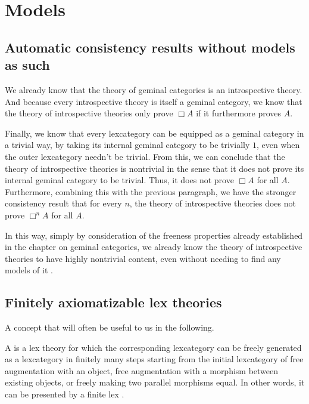 \section{Models}

\subsection{Automatic consistency results without models as such}
We already know that the theory of geminal categories is an introspective theory. And because every introspective theory is itself a geminal category, we know that the theory of introspective theories only prove $\Box A$ if it furthermore proves $A$.

Finally, we know that every lexcategory can be equipped as a geminal category in a trivial way, by taking its internal geminal category to be trivially $1$, even when the outer lexcategory needn't be trivial. From this, we can conclude that the theory of introspective theories is nontrivial in the sense that it does not prove its internal geminal category to be trivial. Thus, it does not prove $\Box A$ for all $A$. Furthermore, combining this with the previous paragraph, we have the stronger consistency result that for every $n$, the theory of introspective theories does not prove $\Box^n A$ for all $A$.

In this way, simply by consideration of the freeness properties already established in the chapter on geminal categories, we already know the theory of introspective theories to have highly nontrivial content, even without needing to find any models of it .


\subsection{Finitely axiomatizable lex theories}
A concept that will often be useful to us in the following.

\begin{definition}
A  is a lex theory for which the corresponding lexcategory can be freely generated as a lexcategory in finitely many steps starting from the initial lexcategory of free augmentation with an object, free augmentation with a morphism between existing objects, or freely making two parallel morphisms equal. In other words, it can be presented by a finite lex . 
\end{definition}

